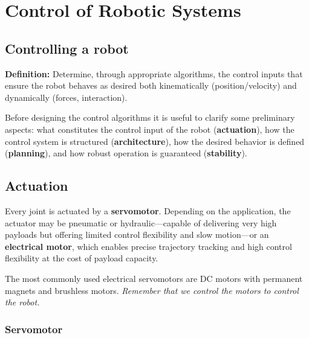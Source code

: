\section{Control of Robotic Systems}

\subsection{Controlling a robot}

\textbf{Definition:} Determine, through appropriate algorithms, the control inputs that ensure the robot behaves as desired both kinematically (position/velocity) and dynamically (forces, interaction).

Before designing the control algorithms it is useful to clarify some preliminary aspects: what constitutes the control input of the robot (\textbf{actuation}), how the control system is structured (\textbf{architecture}), how the desired behavior is defined (\textbf{planning}), and how robust operation is guaranteed (\textbf{stability}).

\hfill

\subsection{Actuation}

Every joint is actuated by a \textbf{servomotor}. Depending on the application, the actuator may be pneumatic or hydraulic—capable of delivering very high payloads but offering limited control flexibility and slow motion—or an \textbf{electrical motor}, which enables precise trajectory tracking and high control flexibility at the cost of payload capacity.
    
The most commonly used electrical servomotors are DC motors with permanent magnets and brushless motors. \textit{Remember that we control the motors to control the robot.}

\newpage

\subsubsection*{Servomotor}

